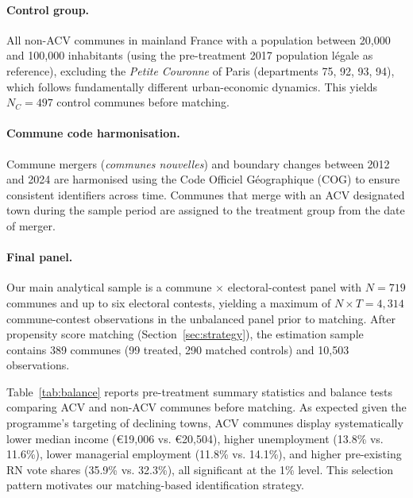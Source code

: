 \paragraph{Control group.} All non-ACV communes in mainland France with a population between 20{,}000 and 100{,}000 inhabitants (using the pre-treatment 2017 population légale as reference), excluding the \textit{Petite Couronne} of Paris (departments 75, 92, 93, 94), which follows fundamentally different urban-economic dynamics. This yields $N_C = 497$ control communes before matching.

\paragraph{Commune code harmonisation.} Commune mergers (\textit{communes nouvelles}) and boundary changes between 2012 and 2024 are harmonised using the Code Officiel Géographique (COG) to ensure consistent identifiers across time. Communes that merge with an ACV designated town during the sample period are assigned to the treatment group from the date of merger.

\paragraph{Final panel.} Our main analytical sample is a commune $\times$ electoral-contest panel with $N = 719$ communes and up to six electoral contests, yielding a maximum of $N \times T = 4{,}314$ commune-contest observations in the unbalanced panel prior to matching. After propensity score matching (Section~\ref{sec:strategy}), the estimation sample contains 389 communes (99 treated, 290 matched controls) and 10{,}503 observations.

Table~\ref{tab:balance} reports pre-treatment summary statistics and balance tests comparing ACV and non-ACV communes before matching. As expected given the programme's targeting of declining towns, ACV communes display systematically lower median income (€19{,}006 vs. €20{,}504), higher unemployment (13.8\% vs. 11.6\%), lower managerial employment (11.8\% vs. 14.1\%), and higher pre-existing RN vote shares (35.9\% vs. 32.3\%), all significant at the 1\% level. This selection pattern motivates our matching-based identification strategy.
